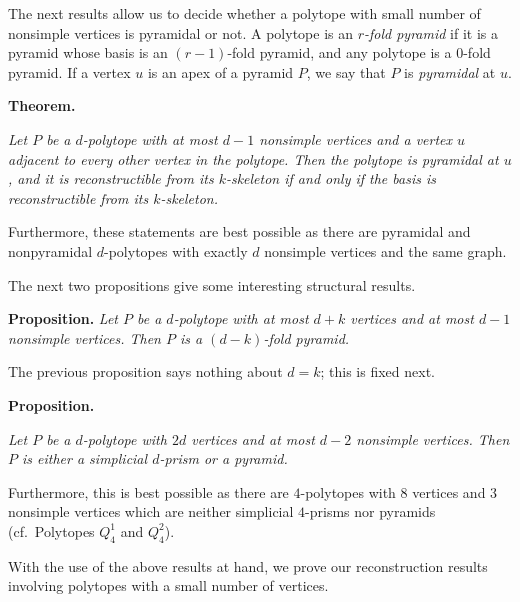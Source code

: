 \documentclass[a4paper]{amsart}
\theoremstyle{definition}
\theoremstyle{remark}
\begin{document}
The next results allow us to decide whether a polytope with small number of nonsimple vertices is pyramidal or not. A polytope is an {\it $r$-fold pyramid} if it is a pyramid whose basis is an $(r-1)$-fold pyramid, and any polytope is a 0-fold pyramid. If a vertex $u$ is an apex of a pyramid $P$, we say that $P$ is {\it pyramidal} at $u$.

{\bf Theorem.} {\it Let $P$ be a $d$-polytope with at most $d-1$ nonsimple vertices and a vertex $u$ adjacent to every other vertex in the polytope. Then the polytope is pyramidal at $u$, and it is reconstructible from its $k$-skeleton if and only if the basis is reconstructible from its $k$-skeleton. 

Furthermore, these statements are best possible as there are pyramidal and nonpyramidal $d$-polytopes with exactly $d$ nonsimple vertices and the same graph.}

The next two propositions give some interesting structural results.

{\bf Proposition.}{ \it Let $P$ be a $d$-polytope with at most $d+k$ vertices and at most $d-1$ nonsimple vertices. Then $P$ is a $(d-k)$-fold pyramid.}

The previous proposition says nothing about $d=k$; this is fixed  next.

{\bf Proposition.} {\it Let $P$ be a $d$-polytope with $2d$ vertices and at most $d-2$ nonsimple vertices. Then $P$ is either a simplicial $d$-prism or a pyramid.

Furthermore, this is best possible as there are $4$-polytopes with 8 vertices and 3 nonsimple vertices which are neither simplicial $4$-prisms nor pyramids (cf.~Polytopes $Q_4^1$ and $Q_4^2$).}

With the use of the above results at hand, we prove our reconstruction results involving polytopes with a small number of vertices.
\end{document}
